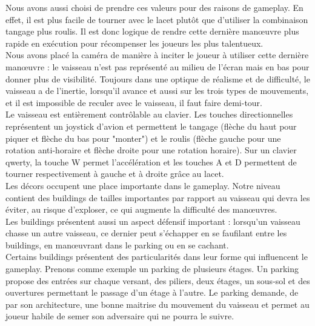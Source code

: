 \documentclass[12pt, titlepage]{article}
\begin{document}
\begin{spacing}{1.5}
Nous avons aussi choisi de prendre ces valeurs pour des raisons de gameplay. En effet, il est plus facile de tourner avec le lacet plutôt que d'utiliser la combinaison tangage plus roulis. Il est donc logique de rendre cette dernière manœuvre plus rapide en exécution pour récompenser les joueurs les plus talentueux. \\

Nous avons placé la caméra de manière à inciter le joueur à utiliser cette dernière manœuvre : le vaisseau n'est pas représenté au milieu de l'écran mais en bas pour donner plus de visibilité. Toujours dans une optique de réalisme et de difficulté, le vaisseau a de l'inertie, lorsqu'il avance et aussi sur les trois types de mouvements, et il est impossible de reculer avec le vaisseau, il
faut faire demi-tour. \\

Le vaisseau est entièrement contrôlable au clavier. Les touches directionnelles représentent un joystick d'avion et permettent le tangage (flèche du haut pour piquer et flèche du bas pour "monter") et le roulis (flèche gauche pour une rotation anti-horaire et flèche droite pour une rotation horaire). Sur un clavier qwerty, la touche W permet l'accélération et les touches A et D permettent de tourner respectivement à gauche et à droite grâce au lacet.\\

Les décors occupent une place importante dans le gameplay. Notre niveau contient des buildings de tailles importantes par rapport au vaisseau qui devra les éviter, au risque d'exploser, ce qui augmente la difficulté des manœuvres.\\

Les buildings présentent aussi un aspect défensif important : lorsqu'un vaisseau chasse un autre vaisseau, ce dernier peut s'échapper en se faufilant entre les buildings, en manœuvrant dans le parking ou en se cachant. \\

Certains buildings présentent des particularités dans leur forme qui influencent le gameplay. Prenons comme exemple un parking de plusieurs étages. Un parking propose des entrées sur chaque versant, des piliers, deux étages, un sous-sol et des ouvertures permettant le passage d'un étage à l'autre. Le parking demande, de par son architecture, une bonne maitrise du mouvement du vaisseau et permet au joueur habile de semer son adversaire qui ne pourra le suivre. \\


\end{spacing}
\end{document}
